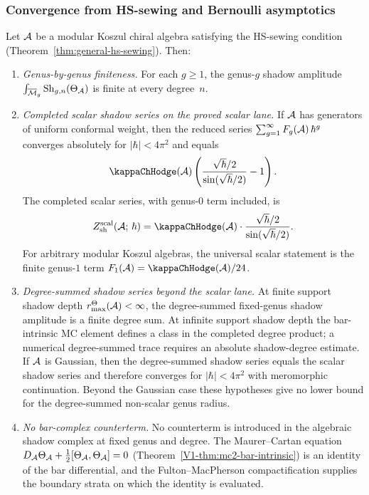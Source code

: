 \subsubsection{Convergence from HS-sewing and Bernoulli asymptotics}

\begin{theorem}
\label{thm:thqg-I-perturbative-finiteness}
Let $\mathcal{A}$ be a modular Koszul chiral algebra satisfying the HS-sewing condition \textup{(}Theorem~\textup{\ref{thm:general-hs-sewing})}. Then:
\begin{enumerate}[label=\textup{(\roman*)}]
\item \emph{Genus-by-genus finiteness.} For each $g \geq 1$, the genus-$g$ shadow amplitude $\int_{\overline{\mathcal{M}}_g} \operatorname{Sh}_{g,n}(\Theta_{\mathcal{A}})$ is finite at every degree~$n$.
\item \emph{Completed scalar shadow series on the proved scalar lane.} If $\mathcal{A}$ has generators of uniform conformal weight, then the reduced series $\sum_{g=1}^{\infty} F_g(\mathcal{A})\,\hbar^g$ converges absolutely for $|\hbar| < 4\pi^2$ and equals
\[
\kappaChHodge(\cA)\left(
\frac{\sqrt{\hbar}/2}{\sin(\sqrt{\hbar}/2)}-1\right).
\]
The completed scalar series, with genus-$0$ term included, is
\[
Z_{\mathrm{sh}}^{\mathrm{scal}}(\cA;\,\hbar)
= \kappaChHodge(\cA)\cdot
\frac{\sqrt{\hbar}/2}{\sin(\sqrt{\hbar}/2)}.
\]
For arbitrary modular Koszul algebras, the universal scalar statement is the finite genus-$1$ term $F_1(\cA)=\kappaChHodge(\cA)/24$.
\item \emph{Degree-summed shadow series beyond the scalar lane.} At finite support shadow depth \(r^\Theta_{\max}(\mathcal{A})<\infty\), the degree-summed fixed-genus shadow amplitude is a finite degree sum. At infinite support shadow depth the bar-intrinsic MC element defines a class in the completed degree product; a numerical degree-summed trace requires an absolute shadow-degree estimate. If $\mathcal{A}$ is Gaussian, then the degree-summed shadow series equals the scalar shadow series and therefore converges for $|\hbar| < 4\pi^2$ with meromorphic continuation. Beyond the Gaussian case these hypotheses give no lower bound for the degree-summed non-scalar genus radius.
\item \emph{No bar-complex counterterm.} No counterterm is introduced in the algebraic shadow complex at fixed genus and degree. The Maurer--Cartan equation $D_{\mathcal{A}}\Theta_{\mathcal{A}} + \tfrac{1}{2}[\Theta_{\mathcal{A}},\Theta_{\mathcal{A}}] = 0$ (Theorem~\ref*{V1-thm:mc2-bar-intrinsic}) is an identity of the bar differential, and the Fulton--MacPherson compactification supplies the boundary strata on which the identity is evaluated.
\end{enumerate}
\end{theorem}

